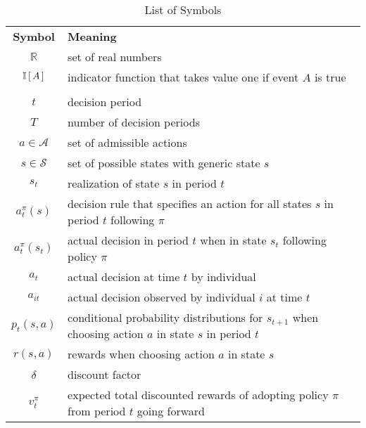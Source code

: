 \begin{longtabu} to \textwidth{CL}
\caption{List of Symbols}
\setlength\extrarowheight{0pt}\\ %
\bottomrule
\textbf{Symbol} & \textbf{Meaning} \\\midrule
\endhead
\bottomrule
\endfoot
    $\mathbb{R}$                        & set of real numbers\\
    $\mathbb{I}\,[\,A\,]$                       & indicator function that takes value one if event $A$ is true\\
    \midrule{}\\\midrule
    $t$                                 & decision period \\
    $T$                                 & number of decision periods\\
    $a \in \mathcal{A}$                 & set of admissible actions\\
    $s \in \mathcal{S}$                 & set of possible states with generic state $s$\\
    $s_t$                               & realization of state $s$ in period $t$\\
    $a^\pi_t(s)$                        & decision rule that specifies an action for all states $s$ in period $t$ following $\pi$\\
    $a^\pi_t(s_t)$                      & actual decision in period $t$ when in state $s_t$ following policy $\pi$\\
    $a_{t}$                             & actual decision at time $t$ by individual\\
    $a_{it}$                            & actual decision observed by individual $i$ at time $t$\\
    $p_t(s, a)$                         & conditional probability distributions for $s_{t + 1}$ when choosing action $a$ in state $s$ in period $t$\\
    $r(s, a)$                           & rewards when choosing action $a$ in state $s$\\
    $\delta$                            & discount factor\\
    $v^\pi_t$                           & expected total discounted rewards of adopting policy $\pi$ from period $t$ going forward\\

\end{longtabu}
